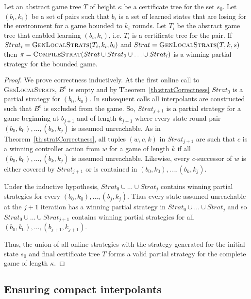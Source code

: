 \begin{theorem}
    Let an abstract game tree $T$ of height $\kappa$ be a certificate tree for the set $s_0$. Let $(b_i, k_i)$ be a set of pairs such that $b_i$ is a set of learned states that are losing for the environment for a game bounded to $k_i$ rounds. Let $T_i$ be the abstract game tree that enabled learning $(b_i, k_i)$, i.e. $T_i$ is a certificate tree for the pair. If $Strat_i = \textsc{GenLocalStrats}(T_i, k_i, b_i)$ and $Strat = \textsc{GenLocalStrats}(T, k, s)$ then $\pi = \textsc{CompileStrat}(Strat \cup Strat_0 \cup \ldots \cup Strat_i)$ is a winning partial strategy for the bounded game.
\end{theorem}
\begin{proof}
    We prove correctness inductively. At the first online call to \textsc{GenLocalStrats}, $B^e$ is empty and by Theorem~\ref{th:stratCorrectness} $Strat_0$ is a partial strategy for $(b_0, k_0)$. In subsequent calls all interpolants are constructed such that $B^e$ is excluded from the game. So, $Strat_{j+1}$ is a partial strategy for a game beginning at $b_{j+1}$ and of length $k_{j+1}$ where every state-round pair $(b_0, k_0), \ldots, (b_k, k_j)$ is assumed unreachable. As in Theorem~\ref{th:stratCorrectness}, all tuples $(w, c, k)$ in $Strat_{j+1}$ are such that $c$ is a winning controller action from $w$ for a game of length $k$ if all $(b_0, k_0), \ldots, (b_k, k_j)$ is assumed unreachable. Likewise, every $c$-successor of $w$ is either covered by $Strat_{j+1}$ or is contained in $(b_0, k_0), \ldots, (b_k, k_j)$.

    Under the inductive hypothesis, $Strat_0 \cup \ldots \cup Strat_j$ contains winning partial strategies for every $(b_0, k_0), \ldots, (b_j, k_j)$. Thus every state assumed unreachable at the $j+1$ iteration has a winning partial strategy in $Strat_0 \cup \ldots \cup Strat_j$ and so $Strat_0 \cup \ldots \cup Strat_{j+1}$ contains winning partial strategies for all $(b_0, k_0), \ldots, (b_{j+1}, k_{j+1})$.

    Thus, the union of all online strategies with the strategy generated for the initial state $s_0$ and final certificate tree $T$ forms a valid partial strategy for the complete game of length $\kappa$.
\end{proof}

\subsection{Ensuring compact interpolants}


